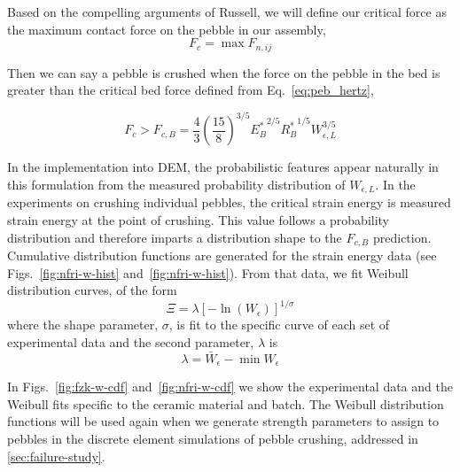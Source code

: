 Based on the compelling arguments of Russell\etal, we will define our critical force as the maximum contact force on the pebble in our assembly,
\begin{equation}
	F_{c} = \max F_{n,ij}
\end{equation}

Then we can say a pebble is crushed when the force on the pebble in the bed is greater than the critical bed force defined from Eq.~\ref{eq:peb_hertz},

\begin{equation}\label{eq:crush-predict}
  F_{c} > F_{c,B} = \frac{4}{3}\left(\frac{15}{8}\right)^{3/5}{E_B^*}^{2/5}{R_B^*}^{1/5}W_{\epsilon,L}^{3/5}
\end{equation}

In the implementation into DEM, the probabilistic features appear naturally in this formulation from the measured probability distribution of $W_{\epsilon,L}$. In the experiments on crushing individual pebbles, the critical strain energy is measured strain energy at the point of crushing. This value follows a probability distribution and therefore imparts a distribution shape to the $F_{c,B}$ prediction. Cumulative distribution functions are generated for the strain energy data (see Figs.~\ref{fig:nfri-w-hist} and~\ref{fig:nfri-w-hist}). From that data, we fit Weibull distribution curves, of the form
\begin{equation}
	\Xi = \lambda\left[-\ln(W_\epsilon)\right]^{1/\sigma}
\end{equation}
where the shape parameter, $\sigma$, is fit to the specific curve of each set of experimental data and the second parameter, $\lambda$ is
\[
\lambda = \bar{W}_\epsilon - \min W_\epsilon
\]

In Figs.~\ref{fig:fzk-w-cdf} and~\ref{fig:nfri-w-cdf} we show the experimental data and the Weibull fits specific to the ceramic material and batch. The Weibull distribution functions will be used again when we generate strength parameters to assign to pebbles in the discrete element simulations of pebble crushing, addressed in \cref{sec:failure-study}.